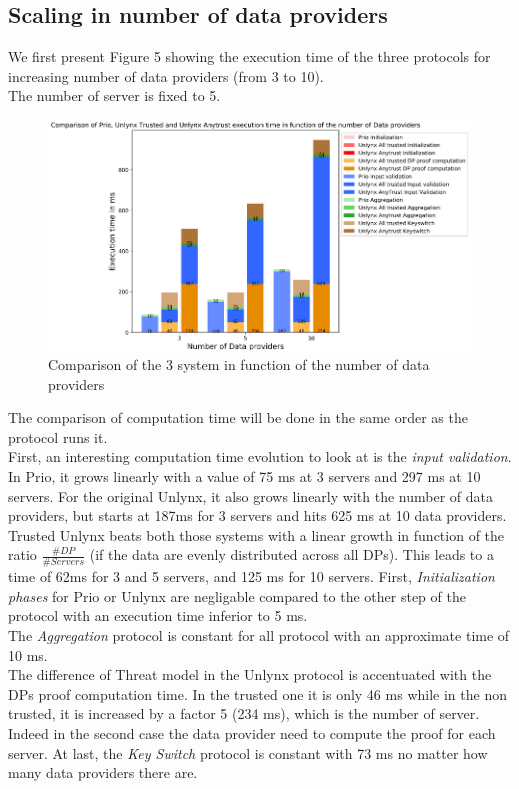 \documentclass{article}
\begin{document}
\subsection{Scaling in number of data providers}
We first present Figure 5 showing the execution time of the three protocols for increasing number of data providers (from 3 to 10).\\
The number of server is fixed to 5.
\begin{figure}[H]
\centering
\includegraphics[scale=0.7]{img/ComparisonlinearDP.png}
\caption{Comparison of the 3 system in function of the number of data providers}
\end{figure}
The comparison of computation time will be done in the same order as the protocol runs it.\\
First, an interesting computation time evolution to look at is the \textit{input validation}. In Prio, it grows linearly with a value of 75 ms at 3 servers and 297 ms at 10 servers. For the original Unlynx, it also grows linearly with the number of data providers, but starts at 187ms for 3 servers and hits 625 ms at 10 data providers. Trusted Unlynx beats both those systems with a linear growth in function of the ratio $\frac{\#DP}{\#Servers}$ (if the data are evenly distributed across all DPs). This leads to a time of 62ms for 3 and 5 servers, and 125 ms for 10 servers.
First, \textit{Initialization phases} for Prio or Unlynx are negligable compared to the other step of the protocol with an execution time inferior to 5 ms.\\
The \textit{Aggregation} protocol is constant for all protocol with an approximate time of 10 ms.\\
The difference of Threat model in the Unlynx protocol is accentuated with the DPs proof computation time. In the trusted one it is only 46 ms while in the non trusted, it is increased by a factor 5 (234 ms), which is the number of server.\\
Indeed in the second case the data provider need to compute the proof for each server.
At last, the \textit{Key Switch} protocol is constant with 73 ms no matter how many data providers there are.\\
\end{document}
